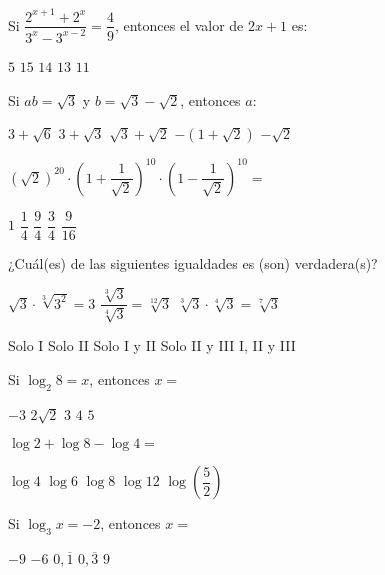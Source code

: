 \documentclass[sin fecha]{srs}
\begin{document}
\begin{preguntas}[after-item-skip=1cm]
\pregunta Si $\dfrac{2^{x+1} + 2^x}{3^x - 3^{x-2}} = \dfrac{4}{9}$, entonces el valor de $2x + 1$ es:
\begin{vertical}
\alternativa $5$
\alternativa $15$
\alternativa $14$
\alternativa $13$
\alternativa $11$
\end{vertical}

\pregunta Si $ab = \sqrt{3}$ y $b = \sqrt{3} - \sqrt{2}$, entonces $a:$
\begin{vertical}
\alternativa $3 + \sqrt{6}$
\alternativa $3 + \sqrt{3}$
\alternativa $\sqrt{3} + \sqrt{2}$
\alternativa $-\left(1 + \sqrt{2}\right)$
\alternativa $-\sqrt{2}$
\end{vertical}

\pregunta $\left(\sqrt{2}\right)^{20} \cdot \left(1 + \dfrac{1}{\sqrt{2}}\right)^{10} \cdot \left(1 - \dfrac{1}{\sqrt{2}}\right)^{10} =$
\begin{vertical}
\alternativa $1$
\alternativa $\dfrac{1}{4}$
\alternativa $\dfrac{9}{4}$
\alternativa $\dfrac{3}{4}$
\alternativa $\dfrac{9}{16}$
\end{vertical}


\pregunta ¿Cuál(es) de las siguientes igualdades es (son) verdadera(s)?
\begin{verticali}
\alternativa $\sqrt{3} \cdot \sqrt[3]{3^2} = 3$
\alternativa $\dfrac{\sqrt[3]{3}}{\sqrt[4]{3}} = \sqrt[12]{3}$
\alternativa $\sqrt[3]{3} \cdot \sqrt[4]{3} = \sqrt[7]{3}$
\end{verticali}
\begin{vertical}
\alternativa Solo I
\alternativa Solo II
\alternativa Solo I y II
\alternativa Solo II y III
\alternativa I, II y III
\end{vertical}

\pregunta Si $\log_2 8 = x$, entonces $x =$
\begin{vertical}
\alternativa $-3$
\alternativa $2\sqrt{2}$
\alternativa $3$
\alternativa $4$
\alternativa $5$
\end{vertical}

\pregunta $\log 2 + \log 8 - \log 4 =$
\begin{vertical}
\alternativa $\log 4$
\alternativa $\log 6$
\alternativa $\log 8$
\alternativa $\log 12$
\alternativa $\log \left(\dfrac{5}{2}\right)$
\end{vertical}

\pregunta Si $\log_3 x = -2$, entonces $x =$
\begin{vertical}
\alternativa $-9$
\alternativa $-6$
\alternativa $0,\overline{1}$
\alternativa $0,\overline{3}$
\alternativa $9$
\end{vertical}


\end{preguntas}
\end{document}
